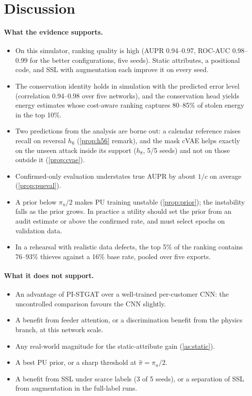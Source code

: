 \documentclass[11pt,a4paper]{article}
\theoremstyle{plain}
\theoremstyle{definition}
\theoremstyle{remark}
\begin{document}
\section{Discussion}
\paragraph{What the evidence supports.}
\begin{itemize}
\item On this simulator, ranking quality is high (AUPR 0.94--0.97, ROC-AUC 0.98--0.99 for the better configurations, five seeds). Static attributes, a positional code, and SSL with augmentation each improve it on every seed.
\item The conservation identity holds in simulation with the predicted error level (correlation 0.94--0.98 over five networks), and the conservation head yields energy estimates whose cost-aware ranking captures 80--85\% of stolen energy in the top 10\%.
\item Two predictions from the analysis are borne out: a calendar reference raises recall on reversal $h_6$ (\cref{prop:h56} remark), and the mask cVAE helps exactly on the unseen attack inside its support ($h_8$, 5/5 seeds) and not on those outside it (\cref{prop:cvae}).
\item Confirmed-only evaluation understates true AUPR by about $1/c$ on average (\cref{prop:pueval}).
\item A prior below $\pi_u/2$ makes PU training unstable (\cref{prop:prior}); the instability falls as the prior grows. In practice a utility should set the prior from an audit estimate or above the confirmed rate, and must select epochs on validation data.
\item In a rehearsal with realistic data defects, the top 5\% of the ranking contains 76--93\% thieves against a 16\% base rate, pooled over five exports.
\end{itemize}
\paragraph{What it does not support.}
\begin{itemize}
\item An advantage of PI-STGAT over a well-trained per-customer CNN: the uncontrolled comparison favours the CNN slightly.
\item A benefit from feeder attention, or a discrimination benefit from the physics branch, at this network scale.
\item Any real-world magnitude for the static-attribute gain (\cref{as:static}).
\item A best PU prior, or a sharp threshold at $\hat\pi=\pi_u/2$.
\item A benefit from SSL under scarce labels (3 of 5 seeds), or a separation of SSL from augmentation in the full-label runs.
\end{itemize}
\end{document}
